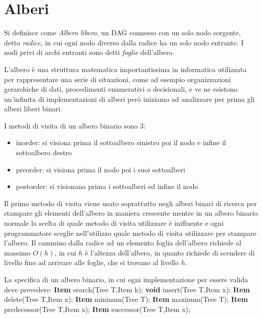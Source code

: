 \section{Alberi}
Si definisce come \emph{Albero libero}, un DAG connesso con un solo nodo sorgente, detto \emph{radice},
in cui ogni nodo diverso dalla radice ha un solo nodo entrante.\newline
I nodi privi di archi entranti sono detti \emph{foglie} dell'albero.


L'albero è una struttura matematica importantissima in informatica utilizzata per
rappresentare una serie di situazioni, come ad esempio organizzazioni gerarchiche di dati,
procedimenti enumerativi o decisionali, e ve ne esistono un'infinita di implementazioni di alberi
però iniziamo ad analizzare per prima gli alberi liberi binari.


I metodi di visita di un albero binario sono 3:
\begin{itemize}
  \item inorder: si visiona prima il sottoalbero sinistro poi il nodo e infine il sottoalbero destro
  \item preorder: si visiona prima il nodo poi i suoi sottoalberi
  \item postorder: si visionano prima i sottoalberi ed infine il nodo
\end{itemize}
Il primo metodo di visita viene usato soprattutto negli alberi binari di ricerca per
stampare gli elementi dell'albero in maniera crescente mentre in un albero binario
normale la scelta di quale metodo di visita utilizzare è inifluente e ogni programmatore
sceglie nell'utilizzo quale metodo di visita utilizzare per stampare l'albero.
Il cammino dalla radice ad un elemento foglia dell'albero richiede al massimo $O(h)$,
in cui $h$ è l'altezza dell'albero, in quanto richiede di scendere di livello fino
ad arrivare alle foglie, che si trovano al livello $h$.

La specifica di un albero binario, in cui ogni implementazione per essere valida deve prevedere:\newline
\textbf{Item} search(Tree T,Item k);\newline
\textbf{void} insert(Tree T,Item x);\newline
\textbf{Item} delete(Tree T,Item x);\newline
\textbf{Item} mininum(Tree T);\newline
\textbf{Item} maxinum(Tree T);\newline
\textbf{Item} predecessor(Tree T,Item x);\newline
\textbf{Item} successor(Tree T,Item x);\newline
